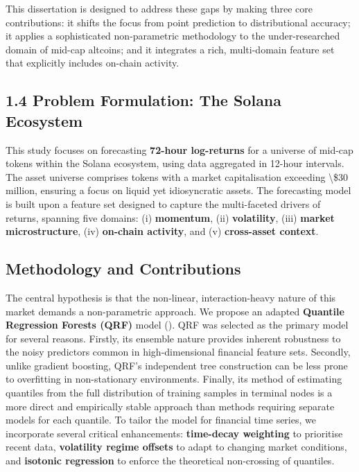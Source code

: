 \documentclass[
  a4paper,
  DIV=11,
  numbers=noendperiod]{scrreprt}
\begin{document}
This dissertation is designed to address these gaps by making three core
contributions: it shifts the focus from point prediction to
distributional accuracy; it applies a sophisticated non-parametric
methodology to the under-researched domain of mid-cap altcoins; and it
integrates a rich, multi-domain feature set that explicitly includes
on-chain activity.

\subsection{1.4 Problem Formulation: The Solana
Ecosystem}\label{problem-formulation-the-solana-ecosystem}

This study focuses on forecasting \textbf{72-hour log-returns} for a
universe of mid-cap tokens within the Solana ecosystem, using data
aggregated in 12-hour intervals. The asset universe comprises tokens
with a market capitalisation exceeding \textbackslash\$30 million,
ensuring a focus on liquid yet idiosyncratic assets. The forecasting
model is built upon a feature set designed to capture the multi-faceted
drivers of returns, spanning five domains: (i) \textbf{momentum}, (ii)
\textbf{volatility}, (iii) \textbf{market microstructure}, (iv)
\textbf{on-chain activity}, and (v) \textbf{cross-asset context}.

\subsection{Methodology and
Contributions}\label{methodology-and-contributions}

The central hypothesis is that the non-linear, interaction-heavy nature
of this market demands a non-parametric approach. We propose an adapted
\textbf{Quantile Regression Forests (QRF)} model
(). QRF was selected as
the primary model for several reasons. Firstly, its ensemble nature
provides inherent robustness to the noisy predictors common in
high-dimensional financial feature sets. Secondly, unlike gradient
boosting, QRF's independent tree construction can be less prone to
overfitting in non-stationary environments. Finally, its method of
estimating quantiles from the full distribution of training samples in
terminal nodes is a more direct and empirically stable approach than
methods requiring separate models for each quantile. To tailor the model
for financial time series, we incorporate several critical enhancements:
\textbf{time-decay weighting} to prioritise recent data,
\textbf{volatility regime offsets} to adapt to changing market
conditions, and \textbf{isotonic regression} to enforce the theoretical
non-crossing of quantiles.
\end{document}
